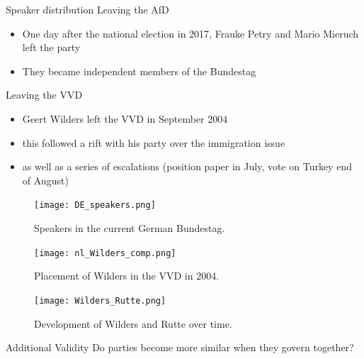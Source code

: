 \documentclass{beamer}
\begin{document}
\begin{frame}[allowframebreaks]{Speaker distribution}
    Leaving the AfD
    \begin{itemize}
        \item One day after the national election in 2017, Frauke Petry and Mario Mieruch left the party
        \item They became independent members of the Bundestag
    \end{itemize}\medskip

    Leaving the VVD
    \begin{itemize}
        \item Geert Wilders left the VVD in September 2004
        \item this followed a rift with his party over the immigration issue
        \item as well as a series of escalations (position paper in July, vote on Turkey end of August)
    \end{itemize}
    \framebreak
    \begin{figure}
        \centering
        \texttt{[image: DE\_speakers.png]}
        \caption{Speakers in the current German Bundestag.}
    \end{figure}
    \begin{figure}
        \centering
        \texttt{[image: nl\_Wilders\_comp.png]}
        \caption{Placement of Wilders in the VVD in 2004.}
    \end{figure}
    \begin{figure}
        \centering
        \texttt{[image: Wilders\_Rutte.png]}
        \caption{Development of Wilders and Rutte over time.}
    \end{figure}
\end{frame}

\begin{frame}{Additional Validity}
    \centering\Large Do parties become more similar when they govern together?
\end{frame}
\end{document}
